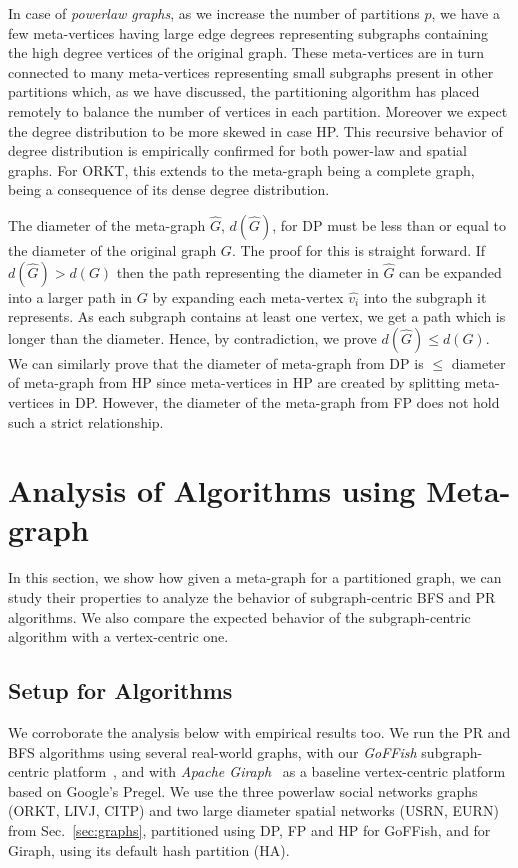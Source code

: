 \documentclass[10pt,conference, compsocconf]{IEEEtran}
\begin{document}
In case of \emph{powerlaw graphs}, as we increase the number of partitions $p$, we have a few meta-vertices having large edge degrees representing subgraphs containing the high degree vertices of the original graph. These meta-vertices are in turn connected to many meta-vertices representing small subgraphs present in other partitions which, as we have discussed, the partitioning algorithm has placed remotely to balance the number of vertices in each partition. Moreover we expect the degree distribution to be more skewed in case HP. This recursive behavior of degree distribution is empirically confirmed for both power-law and spatial graphs. For ORKT, this extends to the meta-graph being a complete graph, being a consequence of its dense degree distribution. 

The diameter of the meta-graph $\widehat{G}$, $d(\widehat{G})$, for DP must be less than or equal to the diameter of the original graph $G$. The proof for this is straight forward. If $d(\widehat{G}) > d(G)$ then the path representing the diameter in $\widehat{G}$ can be expanded into a larger path in $G$ by expanding each meta-vertex $\widehat{v_i}$ into the subgraph it represents. As each subgraph contains at least one vertex, we get a path which is longer than the diameter. Hence, by contradiction, we prove $d(\widehat{G})  \leq d(G)$. We can similarly prove that the diameter of meta-graph from DP is $\leq$ diameter of meta-graph from HP since meta-vertices in HP are created by splitting meta-vertices in DP. However, the diameter of the meta-graph from FP does not hold such a strict relationship.



\section{Analysis of Algorithms using Meta-graph}\label{sec:algos}
In this section, we show how given a meta-graph for a partitioned graph, we can study their properties to analyze the behavior of subgraph-centric BFS and PR algorithms. We also compare the expected behavior of the subgraph-centric algorithm with a vertex-centric one.



\subsection{Setup for Algorithms}

We corroborate the analysis below with empirical results too. We run the PR and BFS algorithms using several real-world graphs, with our \emph{GoFFish} subgraph-centric platform~\cite{goffish}, and with \emph{Apache Giraph}~\cite{giraph} as a baseline vertex-centric platform based on Google's Pregel. We use the three powerlaw social networks graphs (ORKT, LIVJ, CITP) and two large diameter spatial networks (USRN, EURN) from Sec.~\ref{sec:graphs}, partitioned using DP, FP and HP for GoFFish, and for Giraph, using its default hash partition (HA).
\end{document}
